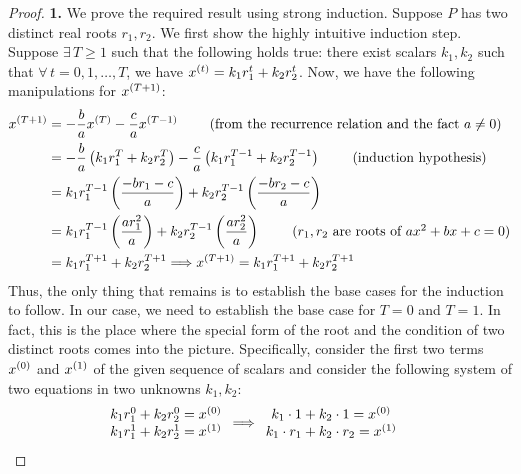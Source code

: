 \documentclass{article}
\begin{document}
\begin{proof}
\textbf{1. }
We prove the required result using strong induction.
Suppose $P$ has two distinct real roots $r_1, r_2$.
We first show the highly intuitive induction step.
Suppose $\exists\,T\geq 1$ such that the following holds true: there exist scalars $k_1, k_2$ such that $\forall\,t=0, 1, \ldots, T$, we have ${x}^{(t)} = k_1 r_1^t + k_2 r_2^t$.
Now, we have the following manipulations for ${x}^{(T + 1)}$:
\begin{align*}
    \evx^{(T + 1)}
    &
    =
    -\frac{b}{a} {\evx^{(T)}}
    -\frac{c}{a} {\evx^{(T - 1)}}\ 
    \tag{from the recurrence relation and the fact $a\ne 0$}
    \nonumber\\
    &
    =
    -\frac{b}{a} \left(k_1 r_1^T + k_2 r_2^T\right)
    -\frac{c}{a} \left(k_1 r_1^{T - 1} + k_2 r_2^{T-1}\right)\ 
    \tag{induction hypothesis}
    \nonumber\\
    &
    =
    k_1 r_1^{T - 1}\left(
        \frac{-b r_1 - c }{a}
    \right)
    +
    k_2 r_2^{T - 1}\left(
        \frac{-b r_2 - c }{a}
    \right)
    \nonumber\\
    &
    =
    k_1 r_1^{T - 1}\left(
        \frac{a r_1^2}{a}
    \right)
    +
    k_2 r_2^{T - 1}\left(
        \frac{a r_2^2}{a}
    \right)\ 
    \tag{$r_1, r_2$ are roots of $ax^2 + bx + c = 0$}
    \nonumber\\
    &
    =
    k_1 r_1^{T + 1}
    +
    k_2 r_2^{T + 1}
    \Longrightarrow 
    \evx^{(T + 1)}
    =
    k_1 r_1^{T + 1}
    +
    k_2 r_2^{T + 1}
\end{align*}
Thus, the only thing that remains is to establish the base cases for the induction to follow.
In our case, we need to establish the base case for $T = 0$ and $T = 1$.
In fact, this is the place where the special form of the root and the condition of two distinct roots comes into the picture.
Specifically, consider the first two terms ${x}^{(0)}$ and ${x}^{(1)}$ of the given sequence of scalars and consider the following system of two equations in two unknowns $k_1, k_2$:
\begin{align*}
&
\begin{array}{c}
     k_1 r_1^0  + k_2 r_2^0 = {x}^{(0)}  
     \\
    k_1 r_1^1  + k_2 r_2^1 = {x}^{(1)} 
\end{array}
\Longrightarrow
\begin{array}{c}
    k_1\cdot 1 + k_2\cdot 1 = {x}^{(0)}  
    \\
    k_1\cdot r_1  + k_2\cdot r_2 = {x}^{(1)} 

\end{array}
\end{align*}
\end{proof}
\end{document}
